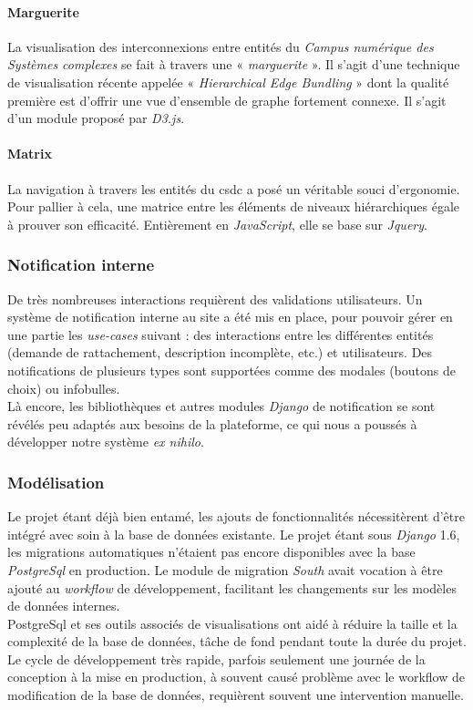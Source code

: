 \documentclass[french, 11pt]{memoir}
\begin{document}
\paragraph{Marguerite}\label{marguerite}

La visualisation des interconnexions entre entités du \emph{Campus
numérique des Systèmes complexes} se fait à travers une «\textit{ marguerite} ».
Il s'agit d'une technique de visualisation récente appelée «
\emph{Hierarchical Edge Bundling\cite{holten2006hierarchical}} » dont la qualité première est
d'offrir une vue d'ensemble de graphe fortement connexe. Il s'agit d'un
module proposé par \emph{D3.js}.


\paragraph{Matrix}\label{matrix}

La navigation à travers les entités du csdc a posé un véritable souci
d'ergonomie. Pour pallier à cela, une matrice entre les éléments de
niveaux hiérarchiques égale à prouver son efficacité. Entièrement en
\emph{JavaScript}, elle se base sur \emph{Jquery}.

\subsubsection{Notification interne}\label{notification-interne}

De très nombreuses interactions requièrent des validations utilisateurs.
Un système de notification interne au site a été mis en place, pour
pouvoir gérer en une partie les \emph{use-cases} suivant : des
interactions entre les différentes entités (demande de rattachement,
description incomplète, etc.) et utilisateurs.
Des
notifications de plusieurs types sont supportées comme des modales
(boutons de choix) ou infobulles.\\
 Là
encore, les bibliothèques et autres modules \emph{Django} de
notification se sont révélés peu adaptés aux besoins de la plateforme,
ce qui nous a poussés à développer notre système \emph{ex nihilo}.

\subsubsection{Modélisation}\label{moduxe9lisation}

Le projet étant déjà bien entamé, les ajouts de fonctionnalités
nécessitèrent d'être intégré avec soin à la base de données existante. Le
projet étant sous \emph{Django} 1.6, les migrations automatiques
n'étaient pas encore disponibles avec la base \emph{PostgreSql} en
production. Le module de migration \emph{South} avait vocation à être
ajouté au \textit{workflow} de développement, facilitant les changements
sur les modèles de données internes. \\ 
PostgreSql et ses outils associés de visualisations ont aidé à réduire la taille 
et la complexité de la base de données, tâche de fond pendant toute la durée du projet. Le
cycle de développement très rapide, parfois seulement une journée de la
conception à la mise en production, à souvent causé problème avec le
workflow de modification de la base de données, requièrent souvent une
intervention manuelle.
\end{document}
